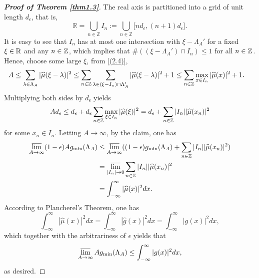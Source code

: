\documentclass[12pt,psfig,reqno]{amsart}
\numberwithin{equation}{section}
\theoremstyle{plain}
\begin{document}
\begin{proof}[\textbf{Proof of Theorem \ref{thm1.3}}]
The real axis is partitioned into a grid of unit length \( d_\epsilon \), that is,
\[
\mathbb{R} =\bigcup_{n \in \mathbb{Z}}I_n:= \bigcup_{n \in \mathbb{Z}} \big[ n d_\epsilon, (n+1) d_\epsilon \big].
\]
It is easy to see that \( I_n \) has at most one intersection with \( \xi-\Lambda_A' \) for a fixed $\xi\in\Bbb R$ and any $n\in\Bbb Z$, which implies that $\#((\xi-\Lambda_A')\cap I_n)\leq 1$ for all $n\in\Bbb Z$. 
Hence, choose some large $\xi$, from \eqref{(2.4)}, 
	\begin{align*}
	A\leq \sum_{\lambda\in\Lambda_A}|\widehat{\mu}(\xi-\lambda)|^2&\leq 
	\sum_{n\in\Bbb Z}\sum_{\lambda\in (\xi-I_n)\cap\Lambda_A'}|\widehat{\mu}(\xi-\lambda)|^2+1\leq 	\sum_{n\in\Bbb Z}\max_{x\in I_n}|\widehat{\mu}(x)|^2+1.
\end{align*}
Multiplying both sides by $d_\epsilon$ yields
\begin{align*}
	Ad_\epsilon\leq d_\epsilon+d_\epsilon\sum_{n\in \Bbb Z}\max_{\xi\in I_n}|\widehat{\mu}(\xi)|^2=d_\epsilon+\sum_{n\in \Bbb Z}|I_n||\widehat{\mu}(x_n)|^2
\end{align*}
for some $x_n\in I_n$. 
Letting $A\rightarrow\infty$, by the claim, one has 
\begin{align*}
\varlimsup_{A\rightarrow\infty}(1-\epsilon)Ag_{\min}(\Lambda_A)&\leq \varlimsup_{A\rightarrow\infty}((1-\epsilon)g_{\min}(\Lambda_A)+\sum_{n\in \Bbb Z}|I_n||\widehat{\mu}(x_n)|^2)
\\
&=\varlimsup_{|I_n|\rightarrow0}\sum_{n\in \Bbb Z}|I_n||\widehat{\mu}(x_n)|^2
\\
&=\int_{-\infty}^{\infty} |\widehat{\mu}(x)|^2dx.
\end{align*}
According to Plancherel's Theorem, one has 
$$
\int_{-\infty}^{\infty}|\widehat{\mu}(x)|^2dx
=\int_{-\infty}^{\infty}|\widehat{g}(x)|^2dx
=\int_{-\infty}^{\infty}|g(x)|^2dx, 
$$
which together with the arbitrariness of $\epsilon$ yields that 
$$
\varlimsup_{A\rightarrow\infty}Ag_{\min}(\Lambda_A)\leq \int_{-\infty}^{\infty}|g(x)|^2dx,
$$
as desired.  
\end{proof}
\end{document}
